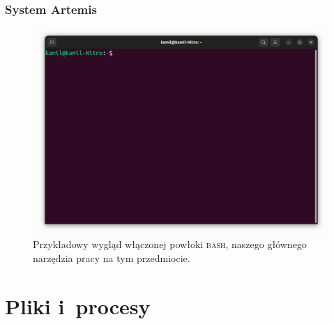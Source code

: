 \documentclass[10pt,t]{beamer}
\begin{document}
\begin{frame}
  \frametitle{System Artemis}

  \vspace{-0.5em}


  \begin{figure}

    \centering


    \includegraphics[scale=0.23]
    {./Presentations-pictures/Miscancellous-pictures/BASH-shell.png}


    \caption{Przykładowy wygląd włączonej powłoki \textsc{bash}, naszego
      głównego narzędzia pracy na tym przedmiocie.}


    \label{fig:BASH-shell}

  \end{figure}

\end{frame}










\section{Pliki i~procesy}
\end{document}
